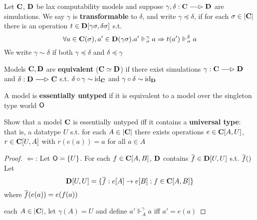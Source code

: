 \documentclass[11pt]{article}
\begin{document}
\begin{definition}[]
Let \(\operatorname{\textbf{C}}\), \(\operatorname{\textbf{D}}\) be lax computability models and suppose \(\gamma,\delta:\bC\lrarhd\bD\) are simulations. We
say \(\gamma\) is \textbf{transformable} to \(\delta\), and write \(\gamma\preceq\delta\), if for each \(\sigma\in\abs{\bC}\) there is an
operation \(t\in\operatorname{\textbf{D}}[\gamma\sigma,\delta\sigma]\) s.t.
\begin{equation*}
\forall a\in\operatorname{\textbf{C}}(\sigma),a'\in\operatorname{\textbf{D}}(\gamma\sigma).a'\Vdash_\sigma^\gamma a\Rightarrow t(a')\Vdash_\sigma^\delta a
\end{equation*}
We write \(\gamma\sim\delta\) if both \(\gamma\preceq\delta\) and \(\delta\preceq\gamma\)
\end{definition}

\begin{definition}[]
Models \(\operatorname{\textbf{C}},\operatorname{\textbf{D}}\) are \textbf{equivalent} (\(\operatorname{\textbf{C}}\simeq\operatorname{\textbf{D}}\)) if there exist simulations \(\gamma:\bC\lrarhd\bD\)
and \(\delta:\bD\lrarhd\bC\) s.t. \(\delta\circ\gamma\sim\operatorname{id}_{\operatorname{\textbf{C}}}\) and \(\gamma\circ\delta\sim\operatorname{id}_{\operatorname{\textbf{D}}}\)
\end{definition}

A model is \textbf{essentially untyped} if it is equivalent to a model over the singleton type world \(\textsf{O}\)

\begin{exercise}
Show that a model \(\operatorname{\textbf{C}}\) is essentially untyped iff it contains a \textbf{universal type}: that is, a
datatype \(U\) s.t. for each \(A\in\abs{\bC}\) there exists operations \(e\in\operatorname{\textbf{C}}[A,U]\), \(r\in\operatorname{\textbf{C}}[U,A]\)
with \(r(e(a))=a\) for all \(a\in A\)
\end{exercise}

\begin{proof}
\(\Leftarrow\): Let \(\textsf{O}=\{U\}\). For each \(f\in\operatorname{\textbf{C}}[A,B]\), \(\operatorname{\textbf{D}}\) contains \(\barf\in\bD[U,U]\) s.t. \(\barf()\)
Let
\begin{equation*}
\bD[U,U]=\{\barf:e[A]\to e[B]:f\in\bC[A,B]\}
\end{equation*}
where \(\barf(e(a))=e(f(a))\)

each \(A\in\abs{\bC}\), let \(\gamma(A)=U\) and define \(a'\Vdash_A^\gamma a\) iff \(a'=e(a)\)
\end{proof}
\end{document}
